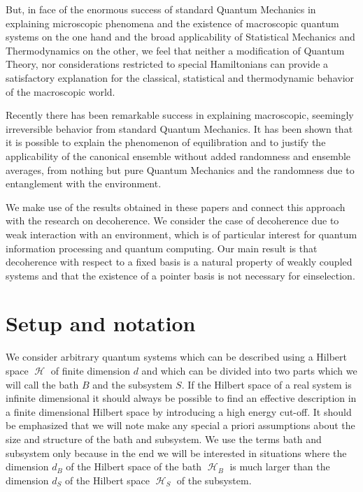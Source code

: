 \documentclass[aps,prl,twocolumn,showpacs,showkeys,a4paper]{revtex4}
\DeclareMathOperator{\hiH}{\mathcal{H}}%
\begin{document}
But, in face of the enormous success of standard Quantum Mechanics in explaining microscopic phenomena and the existence of macroscopic quantum systems on the one hand and the broad applicability of Statistical Mechanics and Thermodynamics on the other, we feel that neither a modification of Quantum Theory, nor considerations restricted to special Hamiltonians can provide a satisfactory explanation for the classical, statistical and thermodynamic behavior of the macroscopic world.

Recently there has been remarkable success in explaining macroscopic, seemingly irreversible behavior from standard Quantum Mechanics.
It has been shown that it is possible to explain the phenomenon of equilibration \cite{gemmermichelmahler04,Reimann08,Linden09,0907.1267v1} and to justify the applicability of the canonical ensemble \cite{Popescu06} without added randomness and ensemble averages, from nothing but pure Quantum Mechanics and the randomness due to entanglement with the environment. 

We make use of the results obtained in these papers and connect this approach with the research on decoherence.
We consider the case of decoherence due to weak interaction with an environment, which is of particular interest for quantum information processing and quantum computing.
Our main result is that decoherence with respect to a fixed basis is a natural property of weakly coupled systems and that the existence of a pointer basis is not necessary for einselection.


\section{Setup and notation}
\label{sec:setupanddefinitions}
% 
We consider arbitrary quantum systems which can be described using a Hilbert space $\hiH$ of finite dimension $d$ and which can be divided into two parts which we will call the bath $B$ and the subsystem $S$.
If the Hilbert space of a real system is infinite dimensional it should always be possible to find an effective description in a finite dimensional Hilbert space by introducing a high energy cut-off. 
It should be emphasized that we will note make any special a priori assumptions about the size and structure of the bath and subsystem.
We use the terms bath and subsystem only because in the end we will be interested in situations where the dimension $d_B$ of the Hilbert space of the bath $\hiH_B$ is much larger than the dimension $d_S$ of the Hilbert space $\hiH_S$ of the subsystem.
\end{document}
